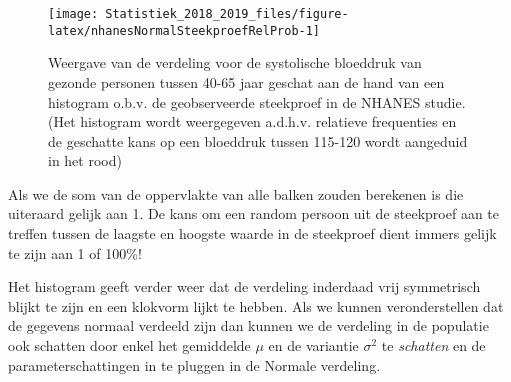 \documentclass[12pt,dutch,coursenotes]{book}
\newenvironment{Shaded}{\begin{snugshade}}{\end{snugshade}}
\newcommand{\KeywordTok}[1]{\textcolor[rgb]{0.13,0.29,0.53}{\textbf{#1}}}
\newcommand{\DataTypeTok}[1]{\textcolor[rgb]{0.13,0.29,0.53}{#1}}
\newcommand{\DecValTok}[1]{\textcolor[rgb]{0.00,0.00,0.81}{#1}}
\newcommand{\FloatTok}[1]{\textcolor[rgb]{0.00,0.00,0.81}{#1}}
\newcommand{\StringTok}[1]{\textcolor[rgb]{0.31,0.60,0.02}{#1}}
\newcommand{\OtherTok}[1]{\textcolor[rgb]{0.56,0.35,0.01}{#1}}
\newcommand{\OperatorTok}[1]{\textcolor[rgb]{0.81,0.36,0.00}{\textbf{#1}}}
\newcommand{\NormalTok}[1]{#1}
\theoremstyle{definition}
\theoremstyle{definition}
\theoremstyle{definition}
\theoremstyle{remark}
\begin{document}
\begin{figure}

{\centering \texttt{[image: Statistiek\_2018\_2019\_files/figure-latex/nhanesNormalSteekproefRelProb-1]} 

}

\caption{Weergave van de verdeling voor de systolische bloeddruk van gezonde personen tussen 40-65 jaar geschat aan de hand van een histogram o.b.v. de geobserveerde steekproef in de NHANES studie. (Het histogram wordt weergegeven a.d.h.v. relatieve frequenties en de geschatte kans op een bloeddruk tussen 115-120 wordt aangeduid in het rood)}\label{fig:nhanesNormalSteekproefRelProb}
\end{figure}

Als we de som van de oppervlakte van alle balken zouden berekenen is die
uiteraard gelijk aan 1. De kans om een random persoon uit de steekproef
aan te treffen tussen de laagste en hoogste waarde in de steekproef
dient immers gelijk te zijn aan 1 of 100\%!

Het histogram geeft verder weer dat de verdeling inderdaad vrij
symmetrisch blijkt te zijn en een klokvorm lijkt te hebben. Als we
kunnen veronderstellen dat de gegevens normaal verdeeld zijn dan kunnen
we de verdeling in de populatie ook schatten door enkel het gemiddelde
\(\mu\) en de variantie \(\sigma^2\) te \emph{schatten} en de
parameterschattingen in te pluggen in de Normale verdeling.

\begin{Shaded}
\end{Shaded}
\end{document}
